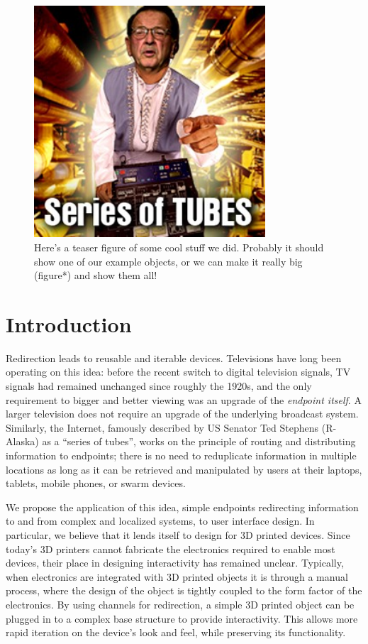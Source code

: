 \begin{figure}[h]
\centering
    \includegraphics[width=3.4in]{figures/series-of-tubes.jpg}
\caption{Here's a teaser figure of some cool stuff we did. Probably it should show one of our example objects, or we can make it really big (figure*) and show them all!}
\label{fig:teaser}
\end{figure}

\section{Introduction}
Redirection leads to reusable and iterable devices.  Televisions have long been operating on this idea: before the recent switch to digital television signals, TV signals had remained unchanged since roughly the 1920s, and the only requirement to bigger and better viewing was an upgrade of the \emph{endpoint itself}.  A larger television does not require an upgrade of the underlying broadcast system.  Similarly, the Internet, famously described by US Senator Ted Stephens (R-Alaska) as a ``series of tubes'', works on the principle of routing and distributing information to endpoints; there is no need to reduplicate information in multiple locations as long as it can be retrieved and manipulated by users at their laptops, tablets, mobile phones, or swarm devices.

We propose the application of this idea, simple endpoints redirecting information to and from complex and localized systems, to user interface design.  In particular, we believe that it lends itself to design for 3D printed devices.  Since today's 3D printers cannot fabricate the electronics required to enable most devices, their place in designing interactivity has remained unclear.  Typically, when electronics are integrated with 3D printed objects it is through a manual process, where the design of the object is tightly coupled to the form factor of the electronics.  By using channels for redirection, a simple 3D printed object can be plugged in to a complex base structure to provide interactivity.  This allows more rapid iteration on the device's look and feel, while preserving its functionality.  

